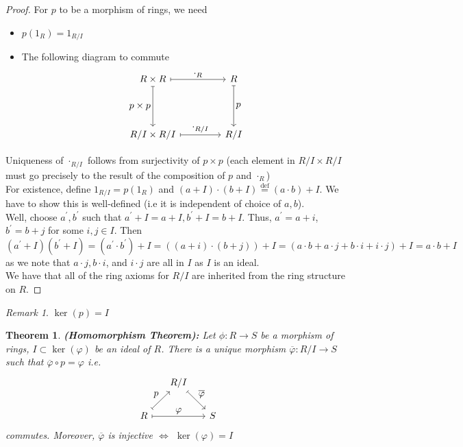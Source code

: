 \documentclass{amsart}
\newcommand{\defeq}						    %
{\overset{\textrm{def}}{=}}
\newtheorem{thm}{Theorem}[section]
\theoremstyle{definition}
\theoremstyle{remark}
\newtheorem*{rmk}{Remark}
\begin{document}
\begin{proof}
    For $p$ to be a morphism of rings, we need
    \begin{itemize}
        \item $p(1_R) = 1_{R/I}$
        \item The following diagram to commute
        \[ \begin{tikzcd}[%
        ,every arrow/.append style={maps to}
        ,every label/.append style={font=\normalsize}
        ,row sep=1.5cm
        ,column sep=1.5cm]
        R \times R \arrow{r}{\cdot_R} \arrow[swap]{d}{p \times p} & R \arrow{d}{p} \\%
        R/I \times R/I \arrow{r}{\cdot_{R/I}}& R/I
        \end{tikzcd}
        \]
    \end{itemize}
    Uniqueness of $\cdot_{R/I}$ follows from surjectivity of $p \times p$ (each element
    in $R / I \times R/I$ must go precisely to the result of the composition of $p$ and
    $\cdot_R$) \\
    For existence, define $1_{R/I} = p(1_R)$ and $(a + I) \cdot (b + I) \defeq (a \cdot b) + I$.
    We have to show this is well-defined (i.e it is independent of choice of $a, b$). \\
    Well, choose $a^\prime, b^\prime$ such that $a^\prime  + I = a + I, b^\prime + I = b + I$.
    Thus, $a^\prime = a + i$, $b^\prime = b + j$ for some $i, j \in I$. Then
    $$
    (a^\prime + I)(b^\prime + I) = (a^\prime \cdot b^\prime) + I = ((a + i)\cdot(b + j)) + I =
    (a\cdot b + a \cdot j + b \cdot i + i \cdot j) + I = a\cdot b + I
    $$
    as we note that $a \cdot j, b \cdot i$, and $i \cdot j$ are all in $I$ as $I$
    is an ideal. \\
    We have that all of the ring axioms for $R / I$ are inherited from the ring
    structure on $R$.
\end{proof}
\begin{rmk}
    $\ker(p) = I$
\end{rmk}
\begin{thm}\label{thm:homomorphism} \textbf{(Homomorphism Theorem):}
    Let $\phi: R \rightarrow S$ be a morphism of rings, $I \subset \ker(\varphi)$ be
    an ideal of $R$. There is a unique morphism $\overline{\varphi}: R/I \rightarrow S$
    such that $\overline{\varphi} \circ p = \varphi$ i.e.
    \[
\begin{tikzcd}[,every arrow/.append style={maps to}
,every label/.append style={font=\normalsize},column sep=1.5em]
 & R/I \arrow{dr}{\overline{\varphi}} \\
R \arrow{ur}{p} \arrow{rr}{\varphi} && S
\end{tikzcd}
\]
commutes. Moreover, $\overline{\varphi}$ is injective $\iff$ $\ker(\varphi) = I$
\end{thm}
\end{document}
